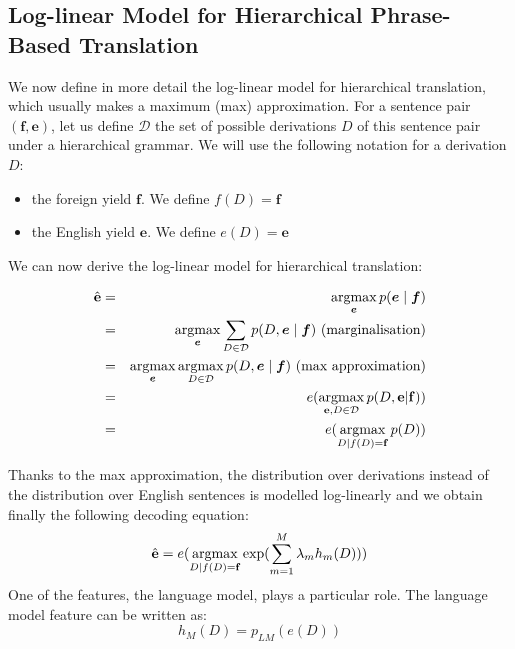 
    \subsection{Log-linear Model for Hierarchical Phrase-Based Translation} \label{sec:loglinear}

    We now define in more detail the log-linear model for hierarchical translation, which usually makes a maximum (max) approximation.
    For a sentence pair $(\bm{f}, \bm{e})$, let us define $\mathcal{D}$ the set of possible derivations $D$ of this sentence pair under 
    a hierarchical grammar. We will use the following notation for a derivation $D$:
    
    \begin{itemize}
      \item the foreign yield $\bm{f}$. We define $f(D) = \bm{f}$
      \item the English yield $\bm{e}$. We define $e(D) = \bm{e}$
    \end{itemize}

    We can now derive the log-linear model for hierarchical translation:

    \begin{eqnarray}
      \hat{{\bf e}} &=& \operatorname*{argmax}_{\bm{e}} p(\bm{e} \mid \bm{f}) \nonumber \\
                    &=& \operatorname*{argmax}_{\bm{e}} \sum_{D \in \mathcal{D}} p(D,\bm{e} \mid \bm{f}) \mbox{ (marginalisation)} \nonumber \\
                    &=& \operatorname*{argmax}_{\bm{e}} \operatorname*{argmax}_{D \in \mathcal{D}} p(D,\bm{e} \mid \bm{f}) \mbox{ (max approximation)} \nonumber \\
                    &=& e(\operatorname*{argmax}_{{\bf e},D \in \mathcal{D}} p(D,{\bf e}|{\bf f})) \nonumber \\
                    &=& e(\operatorname*{argmax}_{D | f(D) = {\bf f}} p(D))
    \end{eqnarray}

    Thanks to the max approximation, the distribution over derivations instead of the distribution over English
    sentences is modelled log-linearly and we obtain finally the following decoding equation:
%
    \begin{equation} \label{eq:decoding}
      \hat{{\bf e}} = e(\operatorname*{argmax}_{D | f(D) = {\bf f}} \exp(\sum_{m=1}^M \lambda_m h_m(D)))
    \end{equation}
%
    One of the features, the language model, plays a particular role. The language model feature can be written as:
%    
    \begin{equation}
      h_M(D) = p_{LM}(e(D))
    \end{equation}
    
